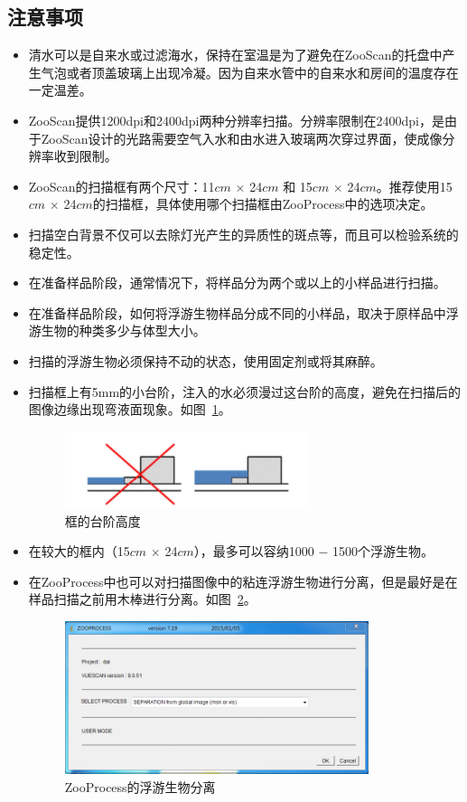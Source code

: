 \documentclass[12pt]{article}
\begin{document}
\subsection{注意事项}
\begin{itemize}
\item 清水可以是自来水或过滤海水，保持在室温是为了避免在ZooScan的托盘中产生气泡或者顶盖玻璃上出现冷凝。因为自来水管中的自来水和房间的温度存在一定温差。
\item ZooScan提供1200dpi和2400dpi两种分辨率扫描。分辨率限制在2400dpi，是由于ZooScan设计的光路需要空气入水和由水进入玻璃两次穿过界面，使成像分辨率收到限制。
\item ZooScan的扫描框有两个尺寸：11$cm$ $\times$ 24$cm$ 和 15$cm$ $\times$ 24$cm$。推荐使用15$cm$ $\times$ 24$cm$的扫描框，具体使用哪个扫描框由ZooProcess中的选项决定。
\item 扫描空白背景不仅可以去除灯光产生的异质性的斑点等，而且可以检验系统的稳定性。
\item 在准备样品阶段，通常情况下，将样品分为两个或以上的小样品进行扫描。
\item 在准备样品阶段，如何将浮游生物样品分成不同的小样品，取决于原样品中浮游生物的种类多少与体型大小。
\item 扫描的浮游生物必须保持不动的状态，使用固定剂或将其麻醉。
\item 扫描框上有5mm的小台阶，注入的水必须漫过这台阶的高度，避免在扫描后的图像边缘出现弯液面现象。如图~\ref{fig:step}。
  \begin{figure}[!ht]
  \centering
   \includegraphics[width=2.8in]{step.png}
    \caption{框的台阶高度}
    \label{fig:step}
   \end{figure}
\item 在较大的框内（15$cm$ $\times$ 24$cm$），最多可以容纳1000 $ - $ 1500个浮游生物。
\item 在ZooProcess中也可以对扫描图像中的粘连浮游生物进行分离，但是最好是在样品扫描之前用木棒进行分离。如图~\ref{fig:separate}。
  \begin{figure}[!ht]
  \centering
   \includegraphics[width=3.5in]{separate}
    \caption{ZooProcess的浮游生物分离}
    \label{fig:separate}
   \end{figure}
\end{itemize}
\end{document}
